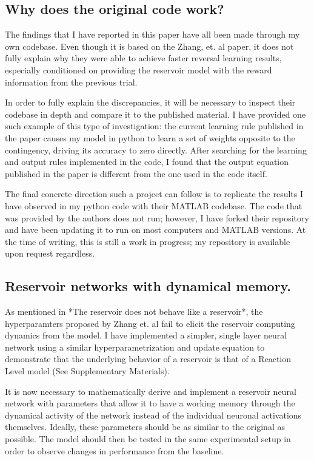 \documentclass[]{article}
\begin{document}
\subsection{Why does the original code work?}
The findings that I have reported in this paper have all been made through my own codebase.  Even though it is based on the Zhang, et. al paper, it does not fully explain why they were able to achieve faster reversal learning results, especially conditioned on providing the reservoir model with the reward information from the previous trial.

In order to fully explain the discrepancies, it will be necessary to inspect their codebase in depth and compare it to the published material.  I have provided one such example of this type of investigation: the current learning rule published in the paper causes my model in python to learn a set of weights opposite to the contingency, driving its accuracy to zero directly.  After searching for the learning and output rules implemented in the code, I found that the output equation published in the paper is different from the one used in the code itself.

The final concrete direction such a project can follow is to replicate the results I have observed in my python code with their MATLAB codebase.  The code that was provided by the authors does not run; however, I have forked their repository and have been updating it to run on most computers and MATLAB versions.  At the time of writing, this is still a work in progress; my repository is available upon request regardless.

\subsection{Reservoir networks with dynamical memory.}
As mentioned in *The reservoir does not behave like a reservoir*, the hyperparamters proposed by Zhang et. al fail to elicit the reservoir computing dynamics from the model.  I have implemented a simpler, single layer neural network using a similar hyperparametrization and update equation to demonstrate that the underlying behavior of a reservoir is that of a Reaction Level model (See Supplementary Materials).

It is now necessary to mathematically derive and implement a reservoir neural network with parameters that allow it to have a working memory through the dynamical activity of the network instead of the individual neuronal activations themselves.  Ideally, these parameters should be as similar to the original as possible.  The model should then be tested in the same experimental setup in order to observe changes in performance from the baseline.
\end{document}
